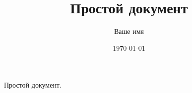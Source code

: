 \documentclass{article}
\begin{document}
\title{Простой документ}
\author{Ваше имя}
\date{\today}
\maketitle

Простой документ.
\end{document}
